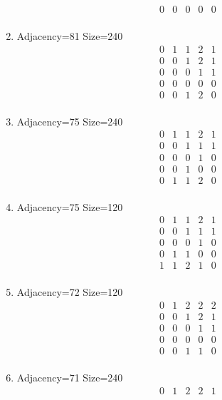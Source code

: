 \documentclass[12pt]{article}
\begin{document}
\begin{multicols}{3}
\begin{enumerate}
\begin{equation*}
\begin{array}{ccccc}
0&0&0&0&0\\
\end{array}
\end{equation*}
\item Adjacency=81 Size=240
\begin{equation*}
\begin{array}{ccccc}
0&1&1&2&1\\
0&0&1&2&1\\
0&0&0&1&1\\
0&0&0&0&0\\
0&0&1&2&0\\
\end{array}
\end{equation*}
\item Adjacency=75 Size=240
\begin{equation*}
\begin{array}{ccccc}
0&1&1&2&1\\
0&0&1&1&1\\
0&0&0&1&0\\
0&0&1&0&0\\
0&1&1&2&0\\
\end{array}
\end{equation*}
\item Adjacency=75 Size=120
\begin{equation*}
\begin{array}{ccccc}
0&1&1&2&1\\
0&0&1&1&1\\
0&0&0&1&0\\
0&1&1&0&0\\
1&1&2&1&0\\
\end{array}
\end{equation*}
\item Adjacency=72 Size=120
\begin{equation*}
\begin{array}{ccccc}
0&1&2&2&2\\
0&0&1&2&1\\
0&0&0&1&1\\
0&0&0&0&0\\
0&0&1&1&0\\
\end{array}
\end{equation*}
\item Adjacency=71 Size=240
\begin{equation*}
\begin{array}{ccccc}
0&1&2&2&1\\

\end{array}
\end{equation*}
\end{enumerate}
\end{multicols}
\end{document}
